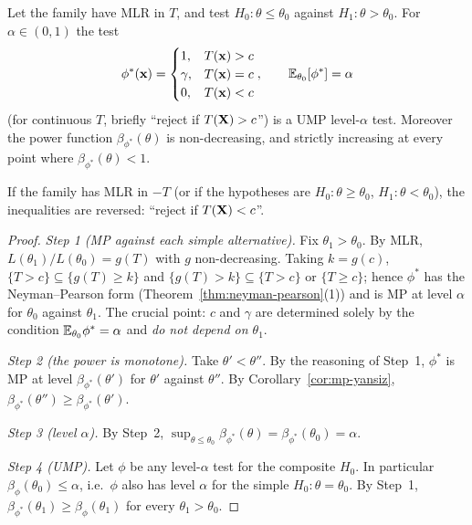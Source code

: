 \documentclass[main.tex]{subfiles}
\begin{document}
\begin{theorem}\label{thm:karlin-rubin}
Let the family have MLR in $T$, and test $H_0: \theta \le \theta_0$ against $H_1: \theta > \theta_0$. For $\alpha\in(0,1)$ the test
\[
\phi^*(\mathbf{x})=\begin{cases}1,& T(\mathbf{x})>c\\ \gamma, & T(\mathbf{x})=c\\ 0, & T(\mathbf{x})<c\end{cases},\qquad \mathbb{E}_{\theta_0}[\phi^*]=\alpha
\]
(for continuous $T$, briefly ``reject if $T(\mathbf{X})>c$'') is a UMP level-$\alpha$ test. Moreover the power function $\beta_{\phi^*}(\theta)$ is non-decreasing, and strictly increasing at every point where $\beta_{\phi^*}(\theta)<1$.

If the family has MLR in $-T$ (or if the hypotheses are $H_0:\theta\ge\theta_0$, $H_1:\theta<\theta_0$), the inequalities are reversed: ``reject if $T(\mathbf{X})<c$''.
\end{theorem}
\begin{proof}
\emph{Step 1 (MP against each simple alternative).} Fix $\theta_1>\theta_0$. By MLR, $L(\theta_1)/L(\theta_0)=g(T)$ with $g$ non-decreasing. Taking $k=g(c)$, $\{T>c\}\subseteq\{g(T)\ge k\}$ and $\{g(T)>k\}\subseteq\{T>c\}$ or $\{T\ge c\}$; hence $\phi^*$ has the Neyman--Pearson form (Theorem~\ref{thm:neyman-pearson}(1)) and is MP at level $\alpha$ for $\theta_0$ against $\theta_1$. The crucial point: $c$ and $\gamma$ are determined solely by the condition $\mathbb{E}_{\theta_0}\phi^*=\alpha$ and \emph{do not depend on $\theta_1$}.

\emph{Step 2 (the power is monotone).} Take $\theta'<\theta''$. By the reasoning of Step~1, $\phi^*$ is MP at level $\beta_{\phi^*}(\theta')$ for $\theta'$ against $\theta''$. By Corollary~\ref{cor:mp-yansiz}, $\beta_{\phi^*}(\theta'')\ge\beta_{\phi^*}(\theta')$.

\emph{Step 3 (level $\alpha$).} By Step~2, $\sup_{\theta\le\theta_0}\beta_{\phi^*}(\theta)=\beta_{\phi^*}(\theta_0)=\alpha$.

\emph{Step 4 (UMP).} Let $\phi$ be any level-$\alpha$ test for the composite $H_0$. In particular $\beta_\phi(\theta_0)\le\alpha$, i.e.\ $\phi$ also has level $\alpha$ for the simple $H_0:\theta=\theta_0$. By Step~1, $\beta_{\phi^*}(\theta_1)\ge\beta_\phi(\theta_1)$ for every $\theta_1>\theta_0$.
\end{proof}
\end{document}
